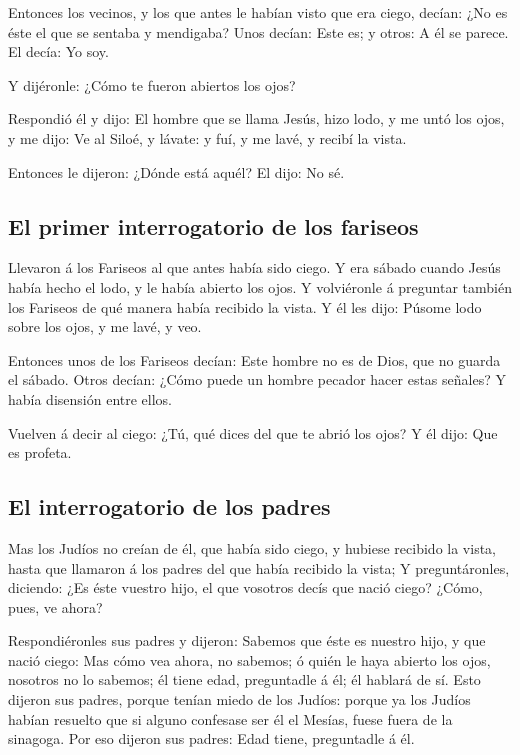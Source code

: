  Entonces los vecinos, y los que antes le habían visto que
era ciego, decían: ¿No es éste el que se sentaba y mendigaba?
 Unos decían: Este es; y otros: A él se parece. El decía: Yo
soy.

 Y dijéronle: ¿Cómo te fueron abiertos los ojos?

 Respondió él y dijo: El hombre que se llama Jesús, hizo
lodo, y me untó los ojos, y me dijo: Ve al Siloé, y lávate: y fuí, y me
lavé, y recibí la vista.

 Entonces le dijeron: ¿Dónde está aquél? El dijo: No sé.

\hypertarget{el-primer-interrogatorio-de-los-fariseos}{%
\subsection{El primer interrogatorio de los
fariseos}\label{el-primer-interrogatorio-de-los-fariseos}}

 Llevaron á los Fariseos al que antes había sido ciego.
 Y era sábado cuando Jesús había hecho el lodo, y le había
abierto los ojos.  Y volviéronle á preguntar también los
Fariseos de qué manera había recibido la vista. Y él les dijo: Púsome
lodo sobre los ojos, y me lavé, y veo.

 Entonces unos de los Fariseos decían: Este hombre no es de
Dios, que no guarda el sábado. Otros decían: ¿Cómo puede un hombre
pecador hacer estas señales? Y había disensión entre ellos.

 Vuelven á decir al ciego: ¿Tú, qué dices del que te abrió
los ojos? Y él dijo: Que es profeta.

\hypertarget{el-interrogatorio-de-los-padres}{%
\subsection{El interrogatorio de los
padres}\label{el-interrogatorio-de-los-padres}}

 Mas los Judíos no creían de él, que había sido ciego, y
hubiese recibido la vista, hasta que llamaron á los padres del que había
recibido la vista;  Y preguntáronles, diciendo: ¿Es éste
vuestro hijo, el que vosotros decís que nació ciego? ¿Cómo, pues, ve
ahora?

 Respondiéronles sus padres y dijeron: Sabemos que éste es
nuestro hijo, y que nació ciego:  Mas cómo vea ahora, no
sabemos; ó quién le haya abierto los ojos, nosotros no lo sabemos; él
tiene edad, preguntadle á él; él hablará de sí.  Esto
dijeron sus padres, porque tenían miedo de los Judíos: porque ya los
Judíos habían resuelto que si alguno confesase ser él el Mesías, fuese
fuera de la sinagoga.  Por eso dijeron sus padres: Edad
tiene, preguntadle á él.

